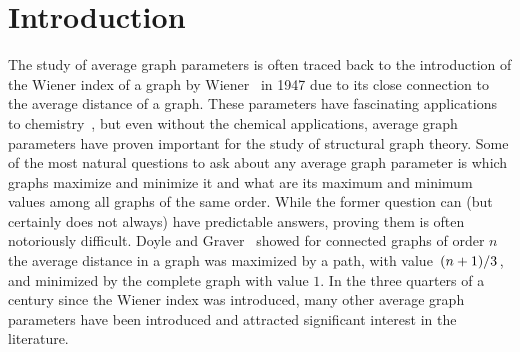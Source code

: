\documentclass[11pt]{article}
\newcommand{\tiltfrac}[2]{\left.#1\middle/#2\right.}
\begin{document}
\section{Introduction}\label{sec:intro}
The study of average graph parameters is often traced back to the introduction of the Wiener index of a graph by Wiener~\cite{1947Wiener} in 1947 due to its close connection to the average distance of a graph. These parameters have fascinating applications to chemistry~\cite{2002Rouvray}, but even without the chemical applications, average graph parameters have proven important for the study of structural graph theory. Some of the most natural questions to ask about any average graph parameter is which graphs maximize and minimize it and what are its maximum and minimum values among all graphs of the same order. While the former question can (but certainly does not always) have predictable answers, proving them is often notoriously difficult. Doyle and Graver~\cite{1977Doyle} showed for connected graphs of order $n$ the average distance in a graph was maximized by a path, with value $\tiltfrac{(n+1)}{3}$, and minimized by the complete graph with value $1$. In the three quarters of a century since the Wiener index was introduced, many other average graph parameters have been introduced and attracted significant interest in the literature.
\end{document}
